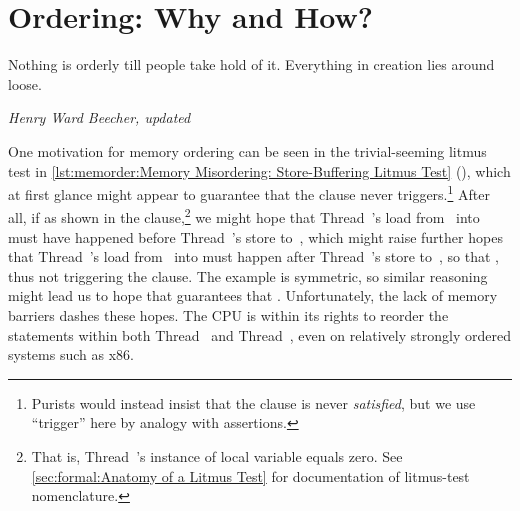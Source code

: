 \QuickQuizEnd

\section{Ordering: Why and How?}
\label{sec:memorder:Ordering: Why and How?}
%
\epigraph{Nothing is orderly till people take hold of it.
	  Everything in creation lies around loose.}
	 {\emph{Henry Ward Beecher, updated}}

One motivation for memory ordering can be seen in the trivial-seeming
litmus test in
\cref{lst:memorder:Memory Misordering: Store-Buffering Litmus Test}
(),
which at first glance might
appear to guarantee that the  clause never triggers.\footnote{
	Purists would instead insist that the  clause is
	never \emph{satisfied}, but we use ``trigger'' here by
	analogy with assertions.}
After all, if  as shown in the  clause,\footnote{
	That is, Thread~'s instance of local variable 
	equals zero.
	See \cref{sec:formal:Anatomy of a Litmus Test}
	for documentation of litmus-test nomenclature.}
we might hope that Thread~'s load from~ into 
must have happened before Thread~'s store to~, which
might raise further hopes that Thread~'s load from~
into  must happen after Thread~'s store to~,
so that , thus not triggering the  clause.
The example is symmetric, so similar reasoning might lead
us to hope that  guarantees that .
Unfortunately, the lack of memory barriers dashes these hopes.
The CPU is within its rights to reorder
the statements within both Thread~ and Thread~,
even on relatively strongly ordered systems such as x86.

